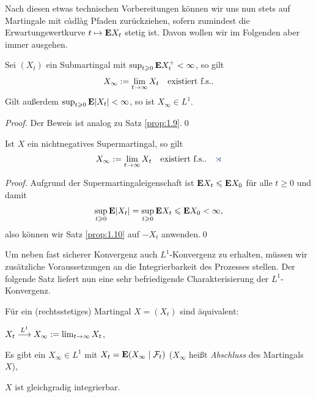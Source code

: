 Nach diesen etwas technischen Vorbereitungen können wir uns nun stets auf
Martingale mit càdlàg Pfaden zurückziehen, sofern zumindest die
Erwartungswertkurve $t\mapsto \mathbf{E} X_t$ stetig ist. Davon wollen wir im Folgenden
aber immer ausgehen.

\begin{prop}
\label{prop:1.10}
Sei $(X_t)$ ein Submartingal mit $\sup_{t\geqslant 0} \mathbf{E} X_t^+ < \infty $, so gilt
\begin{align*}
X_\infty:=\lim_{t\to\infty} X_t \quad \text{existiert f.s.}.
\end{align*}
Gilt außerdem $\sup_{t\geqslant0} \mathbf{E}\lvert X_t\rvert < \infty $, so ist $X_\infty\in
L^1$.\fish
\end{prop}

\begin{proof}
Der Beweis ist analog zu Satz \ref{prop:1.9}.\qed
\end{proof}

\begin{cor}
\label{cor:1.2}
Ist $X$ ein nichtnegatives Supermartingal, so gilt
\begin{align*}
X_\infty\defl \lim_{t\to\infty} X_t \quad \text{existiert f.s.}.\fish
\end{align*}
\end{cor}
\begin{proof}
Aufgrund der Supermartingaleigenschaft ist $\mathbf{E} X_t \leqslant \mathbf{E} X_0$ für alle $t\ge 0$
und damit
\begin{align*}
\sup_{t\geqslant 0} \mathbf{E} \lvert X_t\rvert = 
\sup_{t\geqslant 0} \mathbf{E} X_t \leqslant \mathbf{E} X_0 < \infty,
\end{align*}
also können wir Satz \ref{prop:1.10} auf $-X_t$ anwenden.\qed
\end{proof}

Um neben fast sicherer Konvergenz auch $L^1$-Konvergenz zu erhalten, müssen wir
zusätzliche Voraussetzungen an die Integrierbarkeit des Prozesses stellen. Der
folgende Satz liefert nun eine sehr befriedigende Charakterisierung der
$L^1$-Konvergenz.

\begin{prop}
\label{prop:1.11}
Für ein (rechtsstetiges) Martingal $X=(X_t)$ sind äquivalent:
\begin{equivenum}
\item $X_t \overset{L^1}{\longrightarrow} X_\infty:=\lim_{t\to\infty} X_t$,
\item Es gibt ein $X_\infty \in L^1$ mit $X_t =\mathbf{E}(X_\infty\mid \mathcal{F}_t)$
  ($X_\infty$ heißt \emph{Abschluss} des Martingals $X$),
\item $X$ ist gleichgradig integrierbar.\fish
\end{equivenum}
\end{prop}

